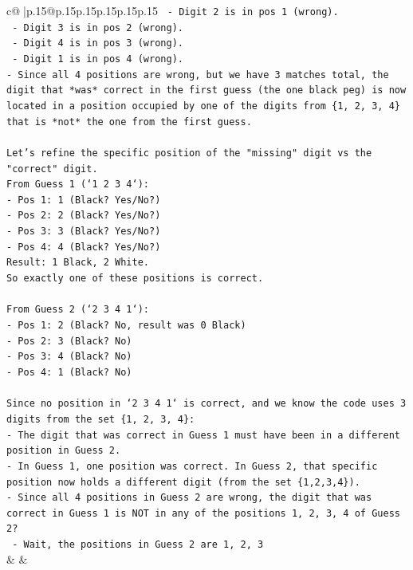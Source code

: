 \documentclass{article}
\begin{document}
{\begin{supertabular}{c@{$\;$}|p{.15\linewidth}@{}p{.15\linewidth}p{.15\linewidth}p{.15\linewidth}p{.15\linewidth}p{.15\linewidth}}
{{{\texttt{    {-}   Digit 2 is in pos 1 (wrong).} \\
\texttt{    {-}   Digit 3 is in pos 2 (wrong).} \\
\texttt{    {-}   Digit 4 is in pos 3 (wrong).} \\
\texttt{    {-}   Digit 1 is in pos 4 (wrong).} \\
\texttt{{-}   Since all 4 positions are wrong, but we have 3 matches total, the digit that *was* correct in the first guess (the one black peg) is now located in a position occupied by one of the digits from \{1, 2, 3, 4\} that is *not* the one from the first guess.} \\
\\ 
\texttt{Let's refine the specific position of the "missing" digit vs the "correct" digit.} \\
\texttt{From Guess 1 (`1 2 3 4`):} \\
\texttt{{-}   Pos 1: 1 (Black? Yes/No?)} \\
\texttt{{-}   Pos 2: 2 (Black? Yes/No?)} \\
\texttt{{-}   Pos 3: 3 (Black? Yes/No?)} \\
\texttt{{-}   Pos 4: 4 (Black? Yes/No?)} \\
\texttt{Result: 1 Black, 2 White.} \\
\texttt{So exactly one of these positions is correct.} \\
\\ 
\texttt{From Guess 2 (`2 3 4 1`):} \\
\texttt{{-}   Pos 1: 2 (Black? No, result was 0 Black)} \\
\texttt{{-}   Pos 2: 3 (Black? No)} \\
\texttt{{-}   Pos 3: 4 (Black? No)} \\
\texttt{{-}   Pos 4: 1 (Black? No)} \\
\\ 
\texttt{Since no position in `2 3 4 1` is correct, and we know the code uses 3 digits from the set \{1, 2, 3, 4\}:} \\
\texttt{{-}   The digit that was correct in Guess 1 must have been in a different position in Guess 2.} \\
\texttt{{-}   In Guess 1, one position was correct. In Guess 2, that specific position now holds a different digit (from the set \{1,2,3,4\}).} \\
\texttt{{-}   Since all 4 positions in Guess 2 are wrong, the digit that was correct in Guess 1 is NOT in any of the positions 1, 2, 3, 4 of Guess 2?} \\
\texttt{    {-}   Wait, the positions in Guess 2 are 1, 2, 3} \\
            }
        }
    }
    & & \\ \\


\end{supertabular}}
\end{document}
